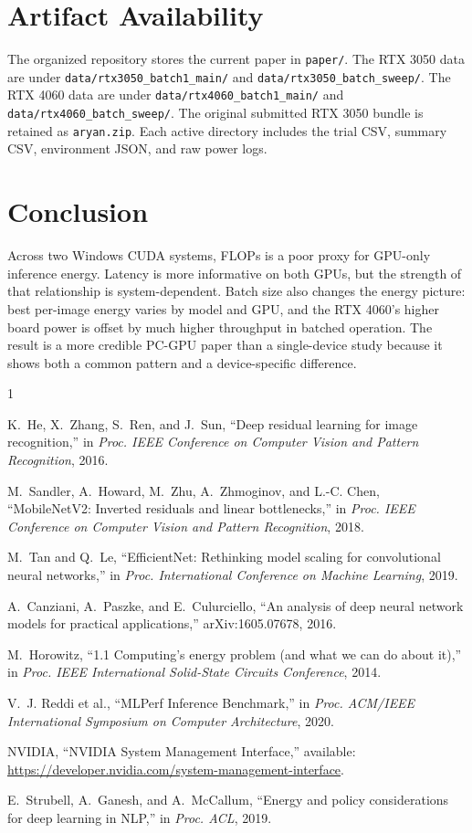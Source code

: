 \documentclass[conference]{IEEEtran}
\begin{document}
\section{Artifact Availability}

The organized repository stores the current paper in \texttt{paper/}. The RTX
3050 data are under \texttt{data/rtx3050\_batch1\_main/} and
\texttt{data/rtx3050\_batch\_sweep/}. The RTX 4060 data are under
\texttt{data/rtx4060\_batch1\_main/} and
\texttt{data/rtx4060\_batch\_sweep/}. The original submitted RTX 3050 bundle
is retained as \texttt{aryan.zip}. Each active directory includes the trial
CSV, summary CSV, environment JSON, and raw power logs.

\section{Conclusion}

Across two Windows CUDA systems, FLOPs is a poor proxy for GPU-only inference
energy. Latency is more informative on both GPUs, but the strength of that
relationship is system-dependent. Batch size also changes the energy picture:
best per-image energy varies by model and GPU, and the RTX 4060's higher board
power is offset by much higher throughput in batched operation. The result is a
more credible PC-GPU paper than a single-device study because it shows both a
common pattern and a device-specific difference.

\begin{thebibliography}{1}

K.~He, X.~Zhang, S.~Ren, and J.~Sun, ``Deep residual learning for image
recognition,'' in \emph{Proc. IEEE Conference on Computer Vision and Pattern
Recognition}, 2016.

M.~Sandler, A.~Howard, M.~Zhu, A.~Zhmoginov, and L.-C. Chen,
``MobileNetV2: Inverted residuals and linear bottlenecks,'' in \emph{Proc.
IEEE Conference on Computer Vision and Pattern Recognition}, 2018.

M.~Tan and Q.~Le, ``EfficientNet: Rethinking model scaling for convolutional
neural networks,'' in \emph{Proc. International Conference on Machine
Learning}, 2019.

A.~Canziani, A.~Paszke, and E.~Culurciello, ``An analysis of deep neural
network models for practical applications,'' arXiv:1605.07678, 2016.

M.~Horowitz, ``1.1 Computing's energy problem (and what we can do about it),''
in \emph{Proc. IEEE International Solid-State Circuits Conference}, 2014.

V.~J. Reddi et al., ``MLPerf Inference Benchmark,'' in \emph{Proc. ACM/IEEE
International Symposium on Computer Architecture}, 2020.

NVIDIA, ``NVIDIA System Management Interface,'' available:
\url{https://developer.nvidia.com/system-management-interface}.

E.~Strubell, A.~Ganesh, and A.~McCallum, ``Energy and policy considerations
for deep learning in NLP,'' in \emph{Proc. ACL}, 2019.

\end{thebibliography}
\end{document}
